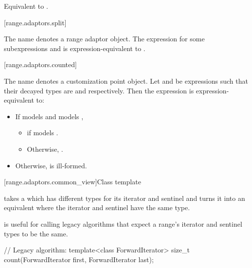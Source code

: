 \begin{addedblock}
\begin{itemdescr}
\pnum
\effects Equivalent to
.
\end{itemdescr}

[range.adaptors.split]{}

\pnum
The name  denotes a
range adaptor object. The expression
 for some subexpressions  and  is
expression-equivalent to .


[range.adaptors.counted]{}

\pnum
The name  denotes a
customization point object.
Let  and  be expressions such that their decayed types are
 and  respectively. Then the expression
 is expression-equivalent to:

\begin{itemize}
\item If  models  and
 models ,
  \begin{itemize}
  \item {} if  models
    .
  \item Otherwise,
    .
\end{itemize}

\item Otherwise,  is ill-formed.
\end{itemize}


[range.adaptors.common_view]{Class template }

\pnum
{} takes a  which has different types for
its iterator and sentinel and turns it into an equivalent 
where the iterator and sentinel have the same type.

\pnum
\begin{note}
 is useful for calling legacy algorithms that expect
a range's iterator and sentinel types to be the same.
\end{note}

\pnum
\begin{example}
\begin{codeblock}
// Legacy algorithm:
template<class ForwardIterator>
size_t count(ForwardIterator first, ForwardIterator last);


\end{codeblock}
\end{example}
\end{addedblock}
